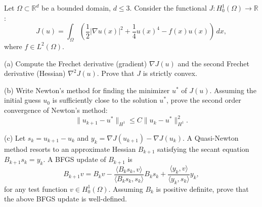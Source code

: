 \begin{exercise}
\label{applied:2026:2}
Let $\Omega\subset \mathbb{R}^d$ be a bounded domain, $d\leq 3$. Consider the functional
$J:H_0^1(\Omega)\to \mathbb{R}$:
\[
J(u)=\int_\Omega \left(\frac{1}{2}|\nabla u(x)|^2+\frac{1}{4}u(x)^4-f(x)u(x)\right)\,dx,
\]
where $f\in L^2(\Omega)$.

(a) Compute the Frechet derivative (gradient) $\nabla J(u)$ and the second Frechet derivative
(Hessian) $\nabla^2J(u)$. Prove that $J$ is strictly convex.

(b) Write Newton's method for finding the minimizer $u^*$ of $J(u)$. Assuming the initial
guess $u_0$ is sufficiently close to the solution $u^*$, prove the second order convergence of
Newton's method:
\[
\|u_{k+1}-u^*\|_{H^1}\leq C\|u_k-u^*\|_{H^1}^2.
\]

(c) Let $s_k=u_{k+1}-u_k$ and $y_k=\nabla J(u_{k+1})-\nabla J(u_k)$. A Quasi-Newton method
resorts to an approximate Hessian $B_{k+1}$ satisfying the secant equation
$B_{k+1}s_k=y_k$. A BFGS update of $B_{k+1}$ is
\[
B_{k+1}v
=B_kv-\frac{\langle B_ks_k,v\rangle}{\langle B_ks_k,s_k\rangle}B_ks_k
+\frac{\langle y_k,v\rangle}{\langle y_k,s_k\rangle}y_k,
\]
for any test function $v\in H_0^1(\Omega)$. Assuming $B_k$ is positive definite, prove that the
above BFGS update is well-defined.
\end{exercise}

